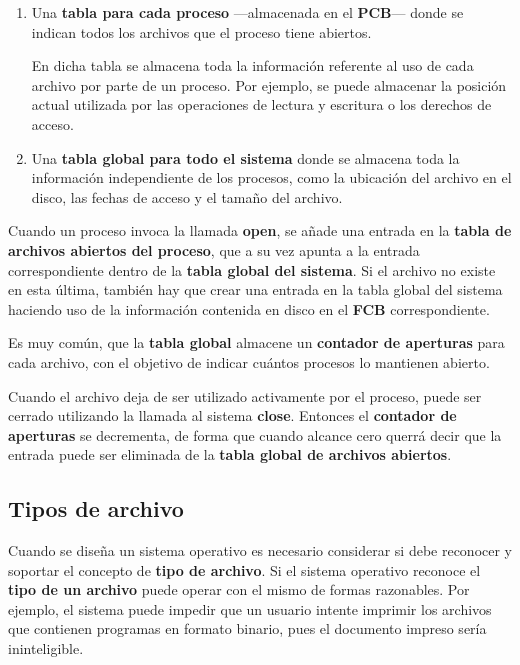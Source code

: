 \begin{enumerate}
\def\labelenumi{\arabic{enumi}.}
\item
  Una \textbf{tabla para cada proceso} ---almacenada en el
  \textbf{PCB}--- donde se indican todos los archivos que el proceso
  tiene abiertos.

  En dicha tabla se almacena toda la información referente al uso de
  cada archivo por parte de un proceso. Por ejemplo, se puede almacenar
  la posición actual utilizada por las operaciones de lectura y
  escritura o los derechos de acceso.
\item
  Una \textbf{tabla global para todo el sistema} donde se almacena toda
  la información independiente de los procesos, como la ubicación del
  archivo en el disco, las fechas de acceso y el tamaño del archivo.
\end{enumerate}

Cuando un proceso invoca la llamada \textbf{open}, se añade una entrada
en la \textbf{tabla de archivos abiertos del proceso}, que a su vez
apunta a la entrada correspondiente dentro de la \textbf{tabla global
del sistema}. Si el archivo no existe en esta última, también hay que
crear una entrada en la tabla global del sistema haciendo uso de la
información contenida en disco en el \textbf{FCB} correspondiente.

Es muy común, que la \textbf{tabla global} almacene un \textbf{contador
de aperturas} para cada archivo, con el objetivo de indicar cuántos
procesos lo mantienen abierto.

Cuando el archivo deja de ser utilizado activamente por el proceso,
puede ser cerrado utilizando la llamada al sistema \textbf{close}.
Entonces el \textbf{contador de aperturas} se decrementa, de forma que
cuando alcance cero querrá decir que la entrada puede ser eliminada de
la \textbf{tabla global de archivos abiertos}.

\subsection{Tipos de archivo}\label{_tipos_de_archivo}

Cuando se diseña un sistema operativo es necesario considerar si debe
reconocer y soportar el concepto de \textbf{tipo de archivo}. Si el
sistema operativo reconoce el \textbf{tipo de un archivo} puede operar
con el mismo de formas razonables. Por ejemplo, el sistema puede impedir
que un usuario intente imprimir los archivos que contienen programas en
formato binario, pues el documento impreso sería ininteligible.


